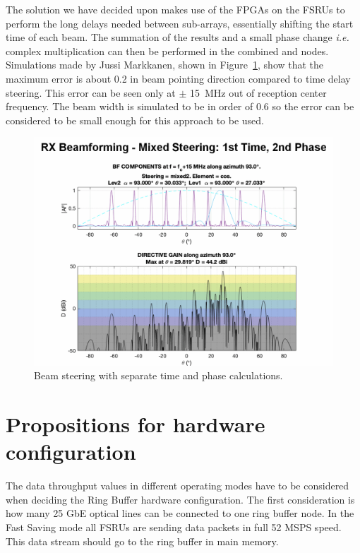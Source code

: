 \documentclass[12pt,a4paper]{article}
\begin{document}
The solution we have decided upon makes use of the FPGAs on the FSRUs to perform the long delays needed between sub-arrays, essentially shifting the start time of each beam. The summation of the results and a small phase change \emph{i.e.} complex multiplication can then be performed in the combined \RB and \SBF nodes.
Simulations made by Jussi Markkanen, shown in Figure~\ref{phase-steering}, show that the maximum error is about 0.2\degree\xspace  in beam pointing direction compared to time delay steering. This error can be seen only at $\pm$ 15~MHz out of reception center frequency. The beam width is simulated to be in order of 0.6\degree\xspace so the error can be considered to be small enough for this approach to be used. 
\begin{figure}[h!]
\centering
\includegraphics[scale=0.5]{E3DDS_D2_phasesteering.png}
\caption{Beam steering with separate time and phase calculations. \label{phase-steering}}
\end{figure}

\iffalse
\section{Propositions for hardware configuration}

The data throughput values in different operating modes have to be considered when deciding the Ring Buffer hardware configuration.
The first consideration is how many 25 GbE optical lines can be connected to one ring buffer node. 
In the Fast Saving mode all FSRUs are sending data packets in full 52 MSPS speed. 
This data stream should go to the ring buffer in main memory. 
\end{document}
